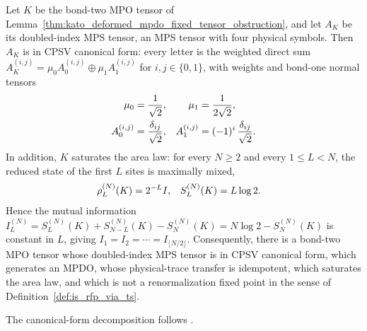\begin{lemma}
    \label{thm:kato_deformed_mpdo_cf_sal_capstone}
    \leanok
    Let $K$ be the bond-two MPO tensor of
    Lemma~\ref{thm:kato_deformed_mpdo_fixed_tensor_obstruction}, and let
    $A_K$ be its doubled-index MPS tensor, an MPS tensor with four physical
    symbols. Then $A_K$ is in CPSV canonical form: every letter is
    the weighted direct sum
    $A_K^{(i,j)}=\mu_0A_0^{(i,j)}\oplus\mu_1A_1^{(i,j)}$ for
    $i,j\in\{0,1\}$, with weights and bond-one normal tensors
    \begin{align}
        \mu_0       & =\frac1{\sqrt2},                     &
        \mu_1       & =\frac1{2\sqrt2},
        \notag                                               \\
        A_0^{(i,j)} & =\frac{\delta_{ij}}{\sqrt2},         &
        A_1^{(i,j)} & =(-1)^i\,\frac{\delta_{ij}}{\sqrt2}.
        \notag
    \end{align}
    In addition, $K$ saturates the area law: for every $N\geq2$ and every
    $1\leq L<N$, the reduced state of the first $L$ sites is maximally
    mixed,
    \begin{align}
        \rho_L^{(N)}(K) & =2^{-L}I, &
        S_L^{(N)}(K)    & =L\log2.
        \notag
    \end{align}
    Hence the mutual information
    $I_L^{(N)}=S_L^{(N)}(K)+S_{N-L}^{(N)}(K)-S_N^{(N)}(K)
        =N\log2-S_N^{(N)}(K)$ is constant in $L$, giving
    $I_1=I_2=\cdots=I_{\lfloor N/2\rfloor}$.
    Consequently, there is a bond-two MPO tensor whose doubled-index MPS
    tensor is in CPSV canonical form, which generates an MPDO, whose
    physical-trace transfer is idempotent, which saturates the area law, and
    which is not a renormalization fixed point in the sense of
    Definition~\ref{def:is_rfp_via_ts}.

    The canonical-form decomposition follows
    \cite[Section~2.3, lines~214--245]{Cirac2016MPDO_arXiv}.
\end{lemma}

